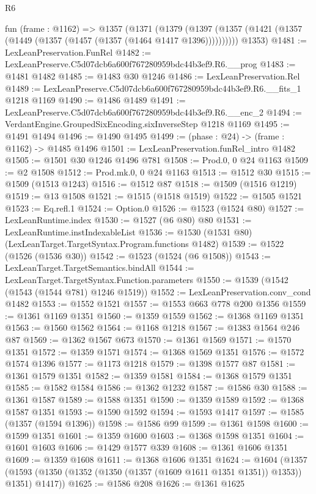 \begin{lexlean}{R6}
\begin{coremodule}
  fun (frame : @1162) =>
  @1357
    (@1371
      (@1379 (@1397 (@1357 (@1421 (@1357 (@1449 (@1357 (@1457 (@1357 (@1464 @1417 @1396))))))))))
      @1353)
@1481 := LexLeanPreservation.FunRel
@1482 := LexLeanPreserve.C5d07dcb6a600f767280959bdc44b3ef9.R6.__prog
@1483 := @1481 @1482
@1485 := @1483 @30 @1246
@1486 := LexLeanPreservation.Rel
@1489 := LexLeanPreserve.C5d07dcb6a600f767280959bdc44b3ef9.R6.__fits_1 @1218 @1169
@1490 := @1486 @1489
@1491 := LexLeanPreserve.C5d07dcb6a600f767280959bdc44b3ef9.R6.__enc_2
@1494 := VerdantEngine.GroupedSixEncoding.sixInverseStep @1218 @1169
@1495 := @1491 @1494
@1496 := @1490 @1495
@1499 := (phase : @24) -> (frame : @1162) -> @1485 @1496
@1501 := LexLeanPreservation.funRel_intro @1482
@1505 := @1501 @30 @1246 @1496 @781
@1508 := Prod.{0, 0} @24 @1163
@1509 := @2 @1508
@1512 := Prod.mk.{0, 0} @24 @1163
@1513 := @1512 @30
@1515 := @1509 (@1513 @1243)
@1516 := @1512 @87
@1518 := @1509 (@1516 @1219)
@1519 := @13 @1508
@1521 := @1515 (@1518 @1519)
@1522 := @1505 @1521
@1523 := Eq.refl.{1}
@1524 := Option.{0}
@1526 := @1523 (@1524 @80)
@1527 := LexLeanRuntime.index
@1530 := @1527 (@6 @80) @80
@1531 := LexLeanRuntime.instIndexableList
@1536 := @1530 (@1531 @80) (LexLeanTarget.TargetSyntax.Program.functions @1482)
@1539 := @1522 (@1526 (@1536 @30))
@1542 := @1523 (@1524 (@6 @1508))
@1543 := LexLeanTarget.TargetSemantics.bindAll
@1544 := LexLeanTarget.TargetSyntax.Function.parameters
@1550 := @1539 (@1542 (@1543 (@1544 @781) @1246 @1519))
@1552 := LexLeanPreservation.conv_cond @1482
@1553 := @1552 @1521
@1557 := @1553 @663 @778 @200 @1356
@1559 := @1361 @1169 @1351
@1560 := @1359 @1559
@1562 := @1368 @1169 @1351
@1563 := @1560 @1562
@1564 := @1168 @1218
@1567 := @1383 @1564 @246 @87
@1569 := @1362 @1567 @673
@1570 := @1361 @1569
@1571 := @1570 @1351
@1572 := @1359 @1571
@1574 := @1368 @1569 @1351
@1576 := @1572 @1574 @1396
@1577 := @1173 @1218
@1579 := @1398 @1577 @87
@1581 := @1361 @1579 @1351
@1582 := @1359 @1581
@1584 := @1368 @1579 @1351
@1585 := @1582 @1584
@1586 := @1362 @1232
@1587 := @1586 @30
@1588 := @1361 @1587
@1589 := @1588 @1351
@1590 := @1359 @1589
@1592 := @1368 @1587 @1351
@1593 := @1590 @1592
@1594 := @1593 @1417
@1597 := @1585 (@1357 (@1594 @1396))
@1598 := @1586 @99
@1599 := @1361 @1598
@1600 := @1599 @1351
@1601 := @1359 @1600
@1603 := @1368 @1598 @1351
@1604 := @1601 @1603
@1606 := @1429 @1577 @339
@1608 := @1361 @1606 @1351
@1609 := @1359 @1608
@1611 := @1368 @1606 @1351
@1624 := @1604
    (@1357 (@1593 (@1350 (@1352 (@1350 (@1357 (@1609 @1611 @1351 @1351)) @1353)) @1351) @1417))
@1625 := @1586 @208
@1626 := @1361 @1625

\end{coremodule}
\end{lexlean}
